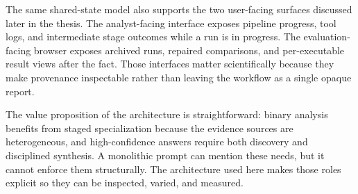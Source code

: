 The same shared-state model also supports the two user-facing surfaces discussed later in the thesis. The analyst-facing interface exposes pipeline progress, tool logs, and intermediate stage outcomes while a run is in progress. The evaluation-facing browser exposes archived runs, repaired comparisons, and per-executable result views after the fact. Those interfaces matter scientifically because they make provenance inspectable rather than leaving the workflow as a single opaque report.

The value proposition of the architecture is straightforward: binary analysis benefits from staged specialization because the evidence sources are heterogeneous, and high-confidence answers require both discovery and disciplined synthesis. A monolithic prompt can mention these needs, but it cannot enforce them structurally. The architecture used here makes those roles explicit so they can be inspected, varied, and measured.
